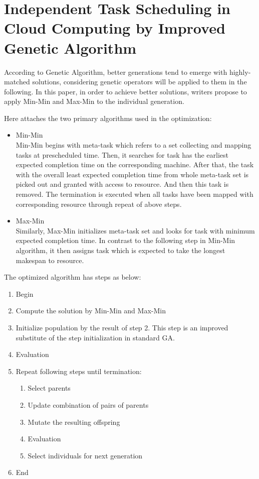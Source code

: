 \documentclass[10pt,twoside,openright,logo]{report}
\begin{document}
\section{Independent Task Scheduling in Cloud Computing by Improved Genetic Algorithm \cite{1}}
According to Genetic Algorithm, better generations tend to emerge with highly-matched solutions, considering genetic operators will be applied to them in the following. In this paper, in order to achieve better solutions, writers propose to apply Min-Min and Max-Min to the individual generation.

Here attaches the two primary algorithms used in the optimization:
\begin{itemize}
	\item Min-Min\\
	Min-Min begins with meta-task which refers to a set collecting and mapping tasks at prescheduled time. Then, it searches for task has the earliest expected completion time on the corresponding machine. After that, the task with the overall least expected completion time from whole meta-task set is picked out and granted with access to resource. And then this task is removed. The termination is executed when all tasks have been mapped with corresponding resource through repeat of above steps.
	
	\item Max-Min\\
	Similarly, Max-Min initializes meta-task set and looks for task with minimum expected completion time. In contrast to the following step in Min-Min algorithm, it then assigns task which is expected to take the longest makespan to resource.
	
\end{itemize}

The optimized algorithm has steps as below:
\begin{enumerate}
	\item Begin
	\item Compute the solution by Min-Min and Max-Min
	\item Initialize population by the result of step 2. This step is an improved substitute of the step initialization in standard GA.
	\item Evaluation
	\item Repeat following steps until termination:
	\begin{enumerate}
		\item Select parents
		\item Update combination of pairs of parents
		\item Mutate the resulting offspring
		\item Evaluation
		\item Select individuals for next generation
	\end{enumerate}
	\item End
\end{enumerate}
\end{document}
